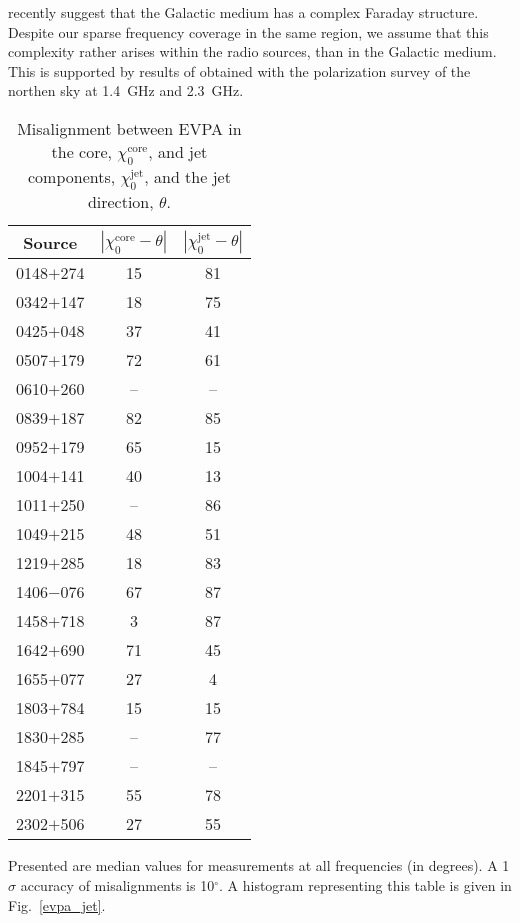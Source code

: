 \documentclass[a4paper,fleqn,usenatbib,useAMS]{mnras}
\begin{document}
\citet{2015ApJ...815...49A} recently suggest that the Galactic medium has a complex Faraday structure. 
Despite our sparse frequency coverage in the same region, we assume that this complexity rather arises within the radio sources, than in the Galactic medium. 
This is supported by results of \citet{2016ApJ...829....5L} obtained with the polarization survey of the northen sky at 1.4~GHz and 2.3~GHz.


\begin{table}
  \caption{Misalignment between EVPA in the core, $\chi^\mathrm{core}_0$, and jet components, $\chi^\mathrm{jet}_0$, and the jet direction, $\theta$.\label{t:evpa_jet}}
  \begin{center}
  \begin{tabular}{ccc}
  \hline
  Source&$|\chi^\mathrm{core}_0-\theta|$&$|{\chi}^\mathrm{jet}_0-\theta|$\\
  \hline
0148$+$274 & 15 & 81\\
0342$+$147  &  18 &   75\\
0425$+$048 &   37  & 41\\
0507$+$179  &  72  &  61\\
0610$+$260 & -- & -- \\
0839$+$187 &   82  &  85\\
0952$+$179  &  65   & 15\\
1004$+$141  & 40  & 13\\
1011$+$250  & -- & 86\\
1049$+$215  &  48 &   51\\
1219$+$285  &  18   & 83\\
1406$-$076  &  67  &  87\\
1458$+$718   & 3 &87\\
1642$+$690 &   71&    45\\
1655$+$077  &  27  &  4\\
1803$+$784  &  15 &   15\\
1830$+$285   & -- & 77\\
1845$+$797 & -- & -- \\
2201$+$315 &   55  & 78\\
2302$+$506  & 27   & 55\\
\hline
\end{tabular}
\end{center}
Presented are median values for measurements at all frequencies (in degrees). 
A 1$\sigma$ accuracy of misalignments is 10$^{\circ}$.
A histogram representing this table is given in Fig.~\ref{evpa_jet}.
\end{table}
\end{document}
